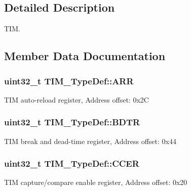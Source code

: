 \subsection{Detailed Description}
T\+IM. 

\subsection{Member Data Documentation}
\subsubsection[{\texorpdfstring{A\+RR}{ARR}}]{ uint32\+\_\+t T\+I\+M\+\_\+\+Type\+Def\+::\+A\+RR}\hypertarget{struct_t_i_m___type_def_a6a42766a6ca3c7fe10a810ebd6b9d627}{}\label{struct_t_i_m___type_def_a6a42766a6ca3c7fe10a810ebd6b9d627}
T\+IM auto-\/reload register, Address offset\+: 0x2C 
\subsubsection[{\texorpdfstring{B\+D\+TR}{BDTR}}]{ uint32\+\_\+t T\+I\+M\+\_\+\+Type\+Def\+::\+B\+D\+TR}\hypertarget{struct_t_i_m___type_def_a137d3523b60951eca1e4130257b2b23d}{}\label{struct_t_i_m___type_def_a137d3523b60951eca1e4130257b2b23d}
T\+IM break and dead-\/time register, Address offset\+: 0x44 
\subsubsection[{\texorpdfstring{C\+C\+ER}{CCER}}]{ uint32\+\_\+t T\+I\+M\+\_\+\+Type\+Def\+::\+C\+C\+ER}\hypertarget{struct_t_i_m___type_def_ad7271cc1eec9ef16e4ee5401626c0b3b}{}\label{struct_t_i_m___type_def_ad7271cc1eec9ef16e4ee5401626c0b3b}
T\+IM capture/compare enable register, Address offset\+: 0x20 
